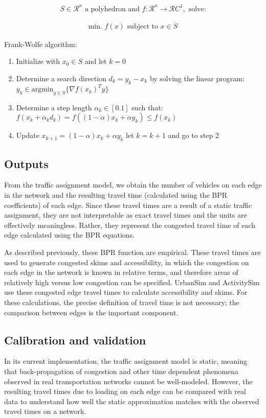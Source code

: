 \begin{align*}
    S \in \mathcal{R}^n \text{ a polyhedron and } f: \mathcal{R}^n \rightarrow \mathcal{R} C^1, \text{ solve:}
\end{align*}

\begin{align*}
    \text{min. } f(x) \text{ subject to } x \in S
\end{align*}

Frank-Wolfe algorithm:

\begin{enumerate}
    \item Initialize with $x_0 \in S$ and let $k= 0$
    \item Determine a search direction $d_k = y_k - x_k$ by solving the linear program: \\
    $y_k \in \text{argmin}_{y \in S} \{ \nabla f(x_k)^Ty \} $
    \item Determine a step length $\alpha_k \in [0.1]$ such that: \\
    $f(x_k + \alpha_k d_k) = f((1 - \alpha)x_k + \alpha y_k) \leq f(x_k)$
    \item Update $x_{k+1} = (1 - \alpha)x_k + \alpha y_k$ let $k = k+1$ and go to step 2
\end{enumerate}

\subsection{Outputs}

From the traffic assignment model, we obtain the number of vehicles on each edge in the network and the resulting travel time (calculated using the BPR coefficients) of each edge. Since these travel times are a result of a static traffic assignment, they are not interpretable as exact travel times and the units are effectively meaningless. Rather, they represent the congested travel time of each edge calculated using the BPR equations.

As described previously, these BPR function are empirical. These travel times are used to generate congested skims and accessibility, in which the congestion on each edge in the network is known in relative terms, and therefore areas of relatively high versus low congestion can be specified. UrbanSim and ActivitySim use these congested edge travel times to calculate accessibility and skims. For these calculations, the precise definition of travel time is not necessary; the comparison between edges is the important component.


\subsection{Calibration and validation}

In its current implementation, the traffic assignment model is static, meaning that back-propagation of congestion and other time dependent phenomena observed in real transportation networks cannot be well-modeled. However, the resulting travel times due to loading on each edge can be compared with real data to understand how well the static approximation matches with the observed travel times on a network. 
